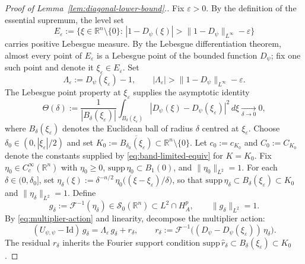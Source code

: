 \documentclass[pdflatex,sn-basic,Numbered]{sn-jnl}
\theoremstyle{thmstyleone}%
\theoremstyle{thmstylethree}%
\begin{document}
\begin{proof}[Proof of Lemma~\ref{lem:diagonal-lower-bound}.]
	Fix $\varepsilon > 0$. By the definition of the essential supremum, the level
	set
	\begin{equation*}\label{eq:level-set}
		E_\varepsilon
		:=\bigl\{\xi \in \mathbb{R}^n \setminus \{0\}
		:\, |1 - D_\psi(\xi)|> \|1 - D_\psi\|_{L^\infty} - \varepsilon \bigr\}
	\end{equation*}
	carries positive Lebesgue measure. By the Lebesgue differentiation theorem,
	almost every point of $E_\varepsilon$ is a Lebesgue point of the bounded
	function $D_\psi$; fix one such point and denote it
	$\xi_\varepsilon \in E_\varepsilon$. Set
	\begin{equation*}\label{eq:Lambda-defn}
		\Lambda_\varepsilon := D_\psi(\xi_\varepsilon) -1,
		\qquad |\Lambda_\varepsilon| >\|1 - D_\psi\|_{L^\infty} -\varepsilon .
	\end{equation*}
	The Lebesgue point property at $\xi_\varepsilon$ supplies the asymptotic
	identity
	\begin{equation}\label{eq:lebesgue-point}
		\Theta(\delta)
		:= \frac{1}{|B_\delta(\xi_\varepsilon)|}
		\int_{B_\delta(\xi_\varepsilon)} |D_\psi(\xi) - D_\psi(\xi_\varepsilon)|^2 \, d\xi
		 \xrightarrow[\delta \to 0]{}  0,
	\end{equation}
	where $B_\delta(\xi_\varepsilon)$ denotes the Euclidean ball of radius $\delta$
	centred at $\xi_\varepsilon$.
	Choose $\delta_0\in (0, |\xi_\varepsilon|/2)$ and set
	$K_0:= \overline{B_{\delta_0}(\xi_\varepsilon)} \subset
	\mathbb{R}^n \setminus \{0\}$. Let $c_0 :=c_{K_0}$ and $C_0:= C_{K_0}$ denote
	the constants supplied by \eqref{eq:band-limited-equiv} for $K= K_0$.
	Fix $\eta_0 \in C_c^\infty(\mathbb{R}^n)$ with $\eta_0 \ge 0$,
	$\mathrm{supp}\,\eta_0\subset B_1(0)$, and $\|\eta_0\|_{L^2}= 1$. For each
	$\delta \in (0, \delta_0]$, set
	$\eta_\delta(\xi):= \delta^{-n/2}\, \eta_0\bigl((\xi- \xi_\varepsilon)/\delta\bigr)$,
	so that $\mathrm{supp}\,\eta_\delta \subset B_\delta(\xi_\varepsilon) \subset K_0$
	and $\|\eta_\delta\|_{L^2} = 1$. Define
	\begin{equation*}\label{eq:test-function}
		g_\delta := \mathcal{F}^{-1}(\eta_\delta)
		 \in  \mathcal{S}_0(\mathbb{R}^n) \subset L^2 \cap H^p_A,
		\qquad \|g_\delta\|_{L^2} = 1.
	\end{equation*}
	By \eqref{eq:multiplier-action} and linearity, decompose the multiplier action:
	\begin{equation}\label{eq:multiplier-split}
		(U_{\psi,\psi} - \mathrm{Id})\, g_\delta
		 =  \Lambda_\varepsilon\, g_\delta + r_\delta,
		\qquad
		r_\delta := \mathcal{F}^{-1}\bigl((D_\psi - D_\psi(\xi_\varepsilon))\,\eta_\delta\bigr).
	\end{equation}
	The residual $r_\delta$ inherits the Fourier support condition
	$\mathrm{supp}\, \hat r_\delta \subset B_\delta(\xi_\varepsilon) \subset K_0$.
	

\end{proof}
\end{document}
